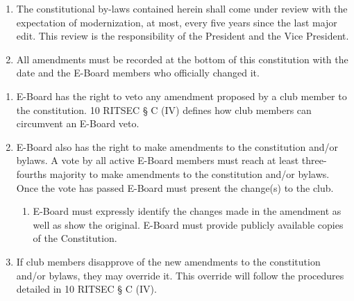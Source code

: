 


\begin{enumerate}
      \item The constitutional by-laws contained herein shall come under review with the
            expectation of modernization, at most, every five years since the last major
            edit. This review is the responsibility of the President and the Vice
            President.
      \item All amendments must be recorded at the bottom of this constitution with the
            date and the E-Board members who officially changed it.
\end{enumerate}


\begin{enumerate}
      \item E-Board has the right to veto any amendment proposed by a club member to the
            constitution. 10 RITSEC § C (IV) defines how club members can circumvent an
            E-Board veto.

      \item E-Board also has the right to make amendments to the constitution and/or
            bylaws. A vote by all active E-Board members must reach at least three-fourths
            majority to make amendments to the constitution and/or bylaws. Once the vote
            has passed E-Board must present the change(s) to the club. %
            \begin{enumerate}
                  \item E-Board must expressly identify the changes made in the amendment as well as
                        show the original. E-Board must provide publicly available copies of the
                        Constitution.
            \end{enumerate}
      \item If club members disapprove of the new amendments to the constitution and/or
            bylaws, they may override it. This override will follow the procedures detailed
            in 10 RITSEC § C (IV).
\end{enumerate}

